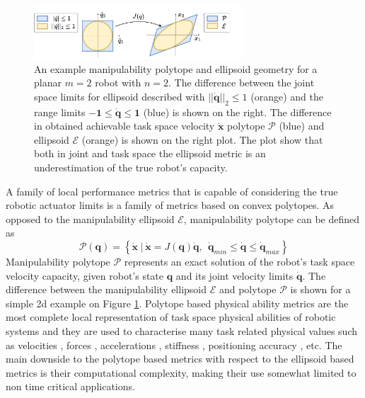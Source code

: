 \begin{figure}
    \centering
    \includegraphics[width=0.7\textwidth]{Chapters/imgs/ellip_poly.pdf}
    \caption{An example manipulability polytope and ellipsoid geometry for a planar $m=2$ robot with $n=2$. The difference between the joint space limits for ellipsoid described with $||\dot{\bm{q}}||_2\leq1$ (orange) and the range limits $\bm{-1}\leq\dot{\bm{q}}\leq\bm{1}$ (blue) is shown on the right. The difference in obtained achievable task space velocity $\dot{\bm{x}}$ polytope $\mathcal{P}$ (blue) and ellipsoid $\mathcal{E}$ (orange) is shown on the right plot. The plot show that both in joint and task space the ellipsoid metric is an underestimation of the true robot's capacity.}
    \label{fig:ellip_poly_dif}
\end{figure}

A family of local performance metrics that is capable of considering the true robotic actuator limits is a family of metrics based on convex polytopes. As opposed to the manipulability ellipsoid $\mathcal{E}$, manipulability polytope can be defined as
\begin{equation}
    \mathcal{P}(\bm{q}) = \left\{ \dot{\bm{x}} ~|~ \dot{\bm{x}} = J(\bm{q})\dot{\bm{q}},~~ \dot{\bm{q}}_{min}\leq\dot{\bm{q}} \leq \dot{\bm{q}}_{max} \right\}
\end{equation}
Manipulability polytope $\mathcal{P}$ represents an exact solution of the robot's task space velocity capacity, given robot's state $\bm{q}$
and its joint velocity limits $\dot{\bm{q}}$. The difference between the manipulability ellipsoid $\mathcal{E}$ and polytope $\mathcal{P}$ is shown for a simple 2d example on Figure \ref{fig:ellip_poly_dif}.
Polytope based physical ability metrics are the most complete local representation of task space physical abilities of robotic systems and they are used to characterise many task related physical values such as velocities \cite{Lee1997manip, long_constrained_2020}, forces \cite{chiacchio_evaluation_1996}, accelerations \cite{chiacchio_2000}, stiffness \cite{ajoudani2015role}, positioning accuracy \cite{pholsiri2005real}, etc.
The main downside to the polytope based metrics with respect to the ellipsoid based metrics is their computational complexity, making their use somewhat limited to non time critical applications.

